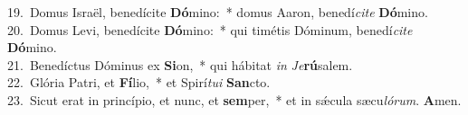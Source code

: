 {19.~}Domus Israël, benedícite \textbf{Dó}mino:~* domus Aaron, benedí\textit{ci}\textit{te} \textbf{Dó}mino.\\
{20.~}Domus Levi, benedícite \textbf{Dó}mino:~* qui timétis Dóminum, benedí\textit{ci}\textit{te} \textbf{Dó}mino.\\
{21.~}Benedíctus Dóminus ex \textbf{Si}on,~* qui hábitat \textit{in} \textit{Je}\textbf{rú}salem.\\
{22.~}Glória Patri, et \textbf{Fí}lio,~* et Spirí\textit{tu}\textit{i} \textbf{San}cto.\\
{23.~}Sicut erat in princípio, et nunc, et \textbf{sem}per,~* et in sǽcula sæcu\textit{ló}\textit{rum}. \textbf{A}men.\\
